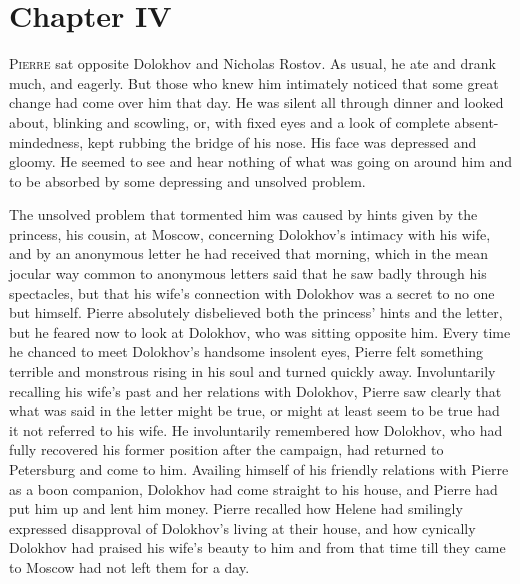 \chapter*{Chapter IV}
\ifaudio     
{} 
\fi

\lettrine[lines=2, loversize=0.3, lraise=0]{\initfamily P}{ierre}
sat opposite Dolokhov and Nicholas Rostov. As usual, he
ate and drank much, and eagerly. But those who knew him
intimately noticed that some great change had come over him that
day. He was silent all through dinner and looked about, blinking
and scowling, or, with fixed eyes and a look of complete
absent-mindedness, kept rubbing the bridge of his nose. His face
was depressed and gloomy. He seemed to see and hear nothing of
what was going on around him and to be absorbed by some
depressing and unsolved problem.

The unsolved problem that tormented him was caused by hints given
by the princess, his cousin, at Moscow, concerning Dolokhov's
intimacy with his wife, and by an anonymous letter he had
received that morning, which in the mean jocular way common to
anonymous letters said that he saw badly through his spectacles,
but that his wife's connection with Dolokhov was a secret to no
one but himself. Pierre absolutely disbelieved both the princess'
hints and the letter, but he feared now to look at Dolokhov, who
was sitting opposite him. Every time he chanced to meet
Dolokhov's handsome insolent eyes, Pierre felt something terrible
and monstrous rising in his soul and turned quickly
away. Involuntarily recalling his wife's past and her relations
with Dolokhov, Pierre saw clearly that what was said in the
letter might be true, or might at least seem to be true had it
not referred to his wife. He involuntarily remembered how
Dolokhov, who had fully recovered his former position after the
campaign, had returned to Petersburg and come to him. Availing
himself of his friendly relations with Pierre as a boon
companion, Dolokhov had come straight to his house, and Pierre
had put him up and lent him money. Pierre recalled how Helene had
smilingly expressed disapproval of Dolokhov's living at their
house, and how cynically Dolokhov had praised his wife's beauty
to him and from that time till they came to Moscow had not left
them for a day.

